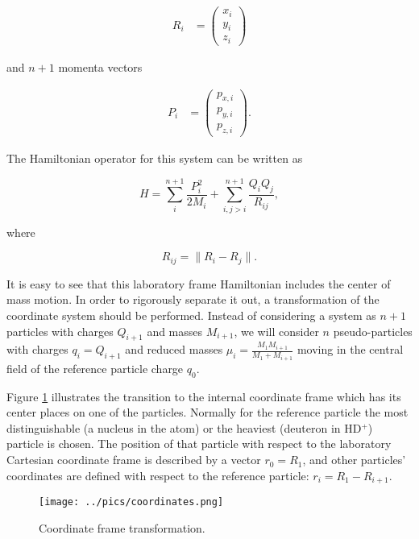 \begin{align}
    R_i &= 
    \begin{pmatrix}
           x_i \\           
           y_i \\
           z_i
    \end{pmatrix}
\end{align}

and $n+1$ momenta vectors

\begin{align}
    P_i &= 
    \begin{pmatrix}
           p_{x,i} \\           
           p_{y,i} \\
           p_{z,i}
    \end{pmatrix}.
\end{align}

The Hamiltonian operator for this system can be written as 

\begin{equation}
H = \sum_i^{n+1} \frac{P_i^2}{2M_i} + \sum_{i,j>i}^{n+1} \frac{Q_i Q_j}{R_{ij}},
\end{equation}

where

\begin{equation}
R_{ij} = \| R_i - R_j \|.
\end{equation}

It is easy to see that this laboratory frame Hamiltonian includes the center
of mass motion. In order to rigorously separate it out, a transformation 
of the coordinate system should be performed. Instead of considering a system
as $n+1$ particles with charges $Q_{i+1}$ and masses $M_{i+1}$, we will consider 
$n$ pseudo-particles with charges $q_i = Q_{i+1}$ and reduced masses 
$\mu_i = \frac{M_1 M_{i+1}}{M_1 + M_{i+1}}$ moving in the
central field of the reference particle charge $q_0$. 

Figure \ref{coord} illustrates the transition to the internal coordinate frame which 
has its center places on one of the particles. Normally for the reference particle
the most distinguishable (a nucleus in the atom) or the heaviest (deuteron
in HD$^+$) particle is chosen. The position of that particle with respect to the 
laboratory Cartesian coordinate frame is described by a vector $r_0 = R_1$,
and other particles' coordinates are defined with respect to the reference particle:
$r_i = R_1 - R_{i+1}$.

\begin{figure}[H]
\begin{center}
\texttt{[image: ../pics/coordinates.png]}
\caption[Coordinate frame transformation]{Coordinate frame transformation. \label{coord}}
\end{center}
\end{figure}

